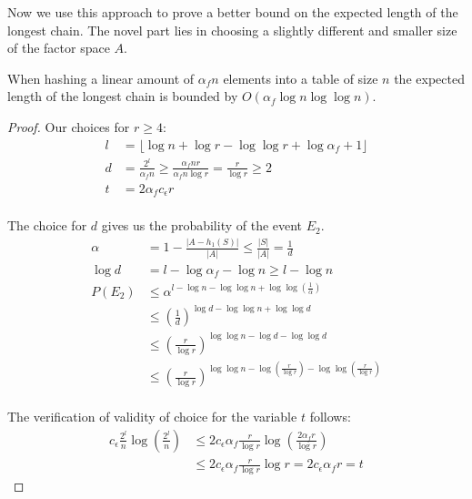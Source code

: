 Now we use this approach to prove a better bound on the expected length of the longest chain. The novel part lies in choosing a slightly different and smaller size of the factor space $A$.
\begin{theorem}
When hashing a linear amount of $\alpha_f n$ elements into a table of size $n$ the expected length of the longest chain is bounded by $O(\alpha_f \log n \log \log n)$.
\end{theorem}
\begin{proof}
Our choices for $r \geq 4$:
\begin{displaymath}
\begin{split}
l & = \lfloor \log n + \log r - \log \log r + \log \alpha_f + 1\rfloor \\
d & = \frac{2^l}{\alpha_f n} \geq \frac{\alpha_f n r}{\alpha_f n \log r} = \frac{r}{\log r} \geq 2 \\
t & = 2 \alpha_f c_\epsilon r \\
\end{split}
\end{displaymath}

The choice for $d$ gives us the probability of the event $E_2$.
\begin{displaymath}
\begin{split}
\alpha & = 1 - \frac{|A - h_1(S)|}{|A|} \leq \frac{|S|}{|A|} = \frac{1}{d} \\
\log d & = l - \log \alpha_f - \log n \geq l - \log n \\
P(E_2) 
	& \leq \alpha^{l - \log n - \log \log n + \log \log \left( \frac{1}{\alpha} \right)} \\
	& \leq \left( \frac{1}{d} \right)^{\log d - \log \log n + \log \log d} \\
	& \leq \left(\frac{r}{\log r}\right)^{\log \log n - \log d - \log \log d} \\
	& \leq \left(\frac{r}{\log r}\right)^{\log \log n - \log \left(\frac{r}{\log r}\right) - \log \log \left(\frac{r}{\log r}\right)} \\
\end{split}
\end{displaymath}

The verification of validity of choice for the variable $t$ follows:
\begin{displaymath}
\begin{split}
c_\epsilon \frac{2^l}{n} \log \left( \frac{2^l}{n} \right) 
	& \leq 2 c_\epsilon \alpha_f \frac{r}{\log r} \log \left( \frac{2 \alpha_f r}{\log r} \right) \\
	& \leq 2 c_\epsilon \alpha_f \frac{r}{\log r} \log r = 2 c_\epsilon \alpha_f r = t
\end{split}
\end{displaymath}


\end{proof}
